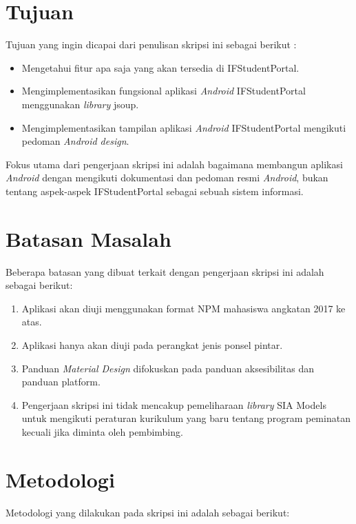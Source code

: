 \section{Tujuan}
\label{sec:tujuan}
Tujuan yang ingin dicapai dari penulisan skripsi ini sebagai berikut :
\begin{itemize}
    \item Mengetahui fitur apa saja yang akan tersedia di IFStudentPortal.
    \item Mengimplementasikan fungsional aplikasi \textit{Android} IFStudentPortal menggunakan \textit{library} jsoup.
    \item Mengimplementasikan tampilan aplikasi \textit{Android} IFStudentPortal mengikuti pedoman \textit{Android design}.
\end{itemize}

Fokus utama dari pengerjaan skripsi ini adalah bagaimana membangun aplikasi \textit{Android} dengan mengikuti dokumentasi dan pedoman resmi \textit{Android}, bukan tentang aspek-aspek IFStudentPortal sebagai sebuah sistem informasi. 
\section{Batasan Masalah}
\label{sec:batasan}
Beberapa batasan yang dibuat terkait dengan pengerjaan skripsi ini adalah sebagai berikut:
\begin{enumerate}
	\item Aplikasi akan diuji menggunakan format NPM mahasiswa angkatan 2017 ke atas.
	\item Aplikasi hanya akan diuji pada perangkat jenis ponsel pintar.
    \item Panduan \textit{Material Design} difokuskan pada panduan aksesibilitas dan panduan platform.
    \item Pengerjaan skripsi ini tidak mencakup pemeliharaan \textit{library} SIA Models untuk mengikuti peraturan kurikulum yang baru tentang program peminatan kecuali jika diminta oleh pembimbing.
\end{enumerate}

\section{Metodologi}
\label{sec:metlit}
Metodologi yang dilakukan pada skripsi ini adalah sebagai berikut:


